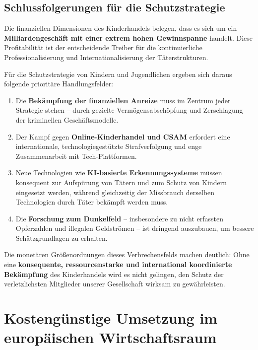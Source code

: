 \documentclass[11pt,a4paper]{article}
\begin{document}
	\subsection{Schlussfolgerungen für die Schutzstrategie}
	
	Die finanziellen Dimensionen des Kinderhandels belegen, dass es sich um ein \textbf{Milliardengeschäft mit einer extrem hohen Gewinnspanne} handelt. Diese Profitabilität ist der entscheidende Treiber für die kontinuierliche Professionalisierung und Internationalisierung der Täterstrukturen.
	
	Für die Schutzstrategie von Kindern und Jugendlichen ergeben sich daraus folgende prioritäre Handlungsfelder:
	\begin{enumerate}[nosep]
		\item Die \textbf{Bekämpfung der finanziellen Anreize} muss im Zentrum jeder Strategie stehen – durch gezielte Vermögensabschöpfung und Zerschlagung der kriminellen Geschäftsmodelle.
		\item Der Kampf gegen \textbf{Online-Kinderhandel und CSAM} erfordert eine internationale, technologiegestützte Strafverfolgung und enge Zusammenarbeit mit Tech-Plattformen.
		\item Neue Technologien wie \textbf{KI-basierte Erkennungssysteme} müssen konsequent zur Aufspürung von Tätern und zum Schutz von Kindern eingesetzt werden, während gleichzeitig der Missbrauch derselben Technologien durch Täter bekämpft werden muss.
		\item Die \textbf{Forschung zum Dunkelfeld} – insbesondere zu nicht erfassten Opferzahlen und illegalen Geldströmen – ist dringend auszubauen, um bessere Schätzgrundlagen zu erhalten.
	\end{enumerate}
	
	Die monetären Größenordnungen dieses Verbrechensfelds machen deutlich: Ohne eine \textbf{konsequente, ressourcenstarke und international koordinierte Bekämpfung} des Kinderhandels wird es nicht gelingen, den Schutz der verletzlichsten Mitglieder unserer Gesellschaft wirksam zu gewährleisten.
	
	\section{Kostengünstige Umsetzung im europäischen Wirtschaftsraum}
	
\end{document}
